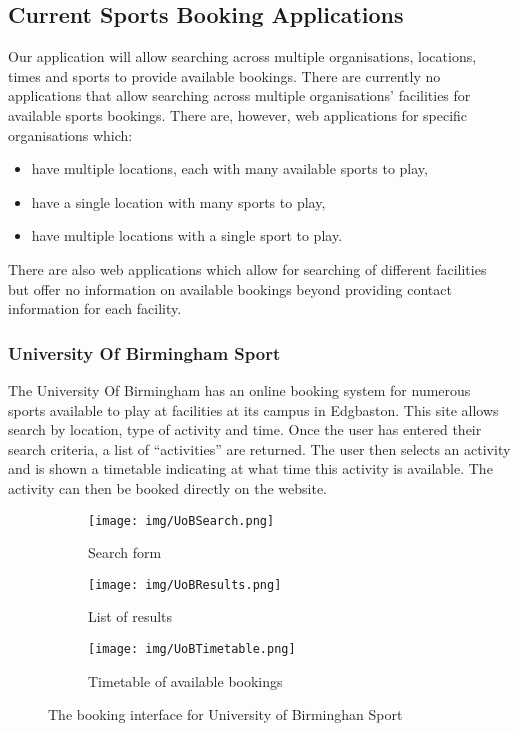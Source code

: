 \subsection{Current Sports Booking Applications}
\label{sub:current_sports_booking_applications}

Our application will allow searching across multiple organisations, locations,
times and sports to provide available bookings. There are currently no
applications that allow searching across multiple organisations' facilities for
available sports bookings. There are, however, web applications for specific
organisations which:
\begin{itemize}
        \item have multiple locations, each with many available sports to play,
        \item have a single location with many sports to play,
        \item have multiple locations with a single sport to play.
\end{itemize}
There are also web applications which allow for searching of different
facilities but offer no information on available bookings beyond providing
contact information for each facility.

\subsubsection{University Of Birmingham Sport}
\label{ssub:university_of_birmingham_sport}

The University Of Birmingham has an online booking system for numerous sports available to play at facilities at its campus in Edgbaston\cite{UOBSport}. This site allows search by location, type of activity and time. Once the user has entered their search criteria, a list of ``activities'' are returned. The user then selects an activity and is shown a timetable indicating at what time this activity is available. The activity can then be booked directly on the website.

\begin{figure}[ht]
\centering
\begin{subfigure}[b]{0.4\textwidth}
                   \texttt{[image: img/UoBSearch.png]}
                   \caption{Search form}\label{fig:UoBSearch}
\end{subfigure}%
\qquad
\begin{subfigure}[b]{0.4\textwidth}
\texttt{[image: img/UoBResults.png]}
\caption{List of results}\label{fig:UoBResults}
            \end{subfigure}
            \qquad
            \begin{subfigure}[b]{0.7\textwidth}
\texttt{[image: img/UoBTimetable.png]}
\caption{Timetable of available bookings}\label{fig:UoBTimetable}
\end{subfigure}
\caption{The booking interface for University of Birminghan Sport}\label{fig:animals}
\end{figure}


